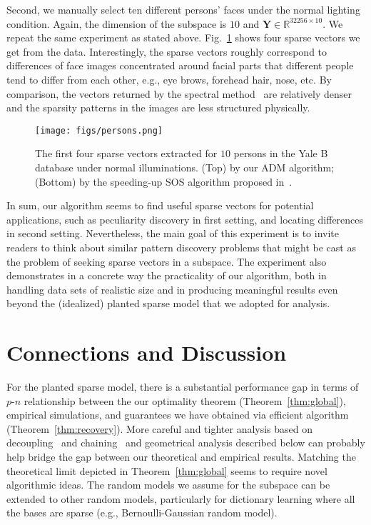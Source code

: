 \documentclass[11pt, journal, final]{IEEEtran}
\numberwithin{equation}{section}
\newcommand{\R}{\mathbb{R}}
\newcommand{\mb}{\mathbf}
\begin{document}
{Second, we manually select ten different persons' faces under the normal lighting condition. Again, the dimension of the subspace is $10$ and ${\mb Y}\in\R^{32256\times 10}$. We repeat the same experiment as stated above. Fig.~\ref{face_exp_2} shows four sparse vectors we get from the data. Interestingly, the sparse vectors roughly correspond to differences of face images concentrated around facial parts that different people tend to differ from each other, e.g., eye brows, forehead hair, nose, etc. By comparison, the vectors returned by the spectral method~\cite{hopkins2015speeding} are relatively denser and the sparsity patterns in the images are less structured physically.

\begin{figure}[!htbp]
\begin{center}
\texttt{[image: figs/persons.png]}
\end{center}
\caption{The first four sparse vectors extracted for $10$ persons in the Yale B database under normal illuminations. (Top) by our ADM algorithm; (Bottom) by the speeding-up SOS algorithm proposed in~\cite{hopkins2015speeding}. }
\label{face_exp_2}
\end{figure}
In sum, our algorithm seems to find useful sparse vectors for potential applications, such as peculiarity discovery in first setting, and locating differences in second setting. Nevertheless, the main goal of this experiment is to invite readers to think about similar pattern discovery problems that might be cast as the problem of seeking sparse vectors in a subspace. The experiment also demonstrates in a concrete way the practicality of our algorithm, both in handling data sets of realistic size and in producing meaningful results even beyond the (idealized) planted sparse model that we adopted for analysis.

\section{Connections and Discussion}\label{sec:discussion}
For the planted sparse model, there is a substantial performance gap in terms of $p$-$n$ relationship between the our optimality theorem (Theorem~\ref{thm:global}), empirical simulations, and guarantees we have obtained via efficient algorithm (Theorem~\ref{thm:recovery}). More careful and tighter analysis based on decoupling~\cite{de1999decoupling} and chaining~\cite{talagrand2014upper, luh15dictionary} and geometrical analysis described below can probably help bridge the gap between our theoretical and empirical results. Matching the theoretical limit depicted in Theorem~\ref{thm:global} seems to require novel algorithmic ideas. The random models we assume for the subspace can be extended to other random models, particularly for dictionary learning where all the bases are sparse (e.g., Bernoulli-Gaussian random model).

}
\end{document}

